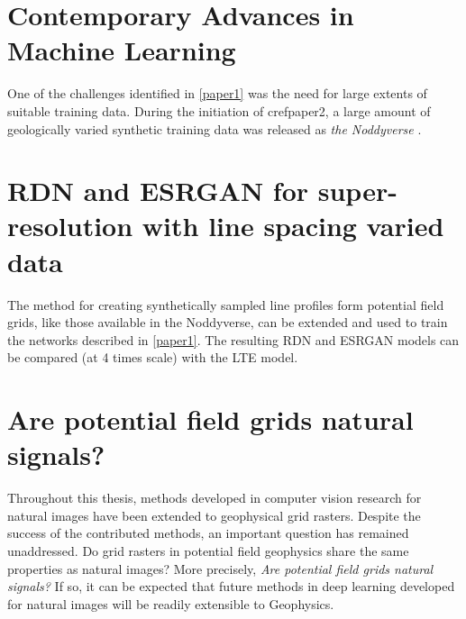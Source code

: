 \documentclass[manuscript.tex]{subfiles}
\begin{document}
\label{discussion}
\section{Contemporary Advances in Machine Learning} %


One of the challenges identified in \cref{paper1} was the need for large extents of suitable training data.
During the initiation of cref{paper2}, a large amount of geologically varied synthetic training data was released as \emph{the Noddyverse} \parencite{jessellNoddyverseMassiveData2022}.

\section{RDN and ESRGAN for super-resolution with line spacing varied data}
The method for creating synthetically sampled line profiles form potential field grids, like those available in the Noddyverse, can be extended and used to train the networks described in \cref{paper1}.
The resulting RDN and ESRGAN models can be compared (at 4 times scale) with the LTE model.



\section{Are potential field grids natural signals?}
Throughout this thesis, methods developed in computer vision research for natural images have been extended to geophysical grid rasters.
Despite the success of the contributed methods, an important question has remained unaddressed.
Do grid rasters in potential field geophysics share the same properties as natural images?
More precisely, \emph{Are potential field grids natural signals?}
If so, it can be expected that future methods in deep learning developed for natural images will be readily extensible to Geophysics.
\Textcite{donohoCompressedSensing2006}

\end{document}
